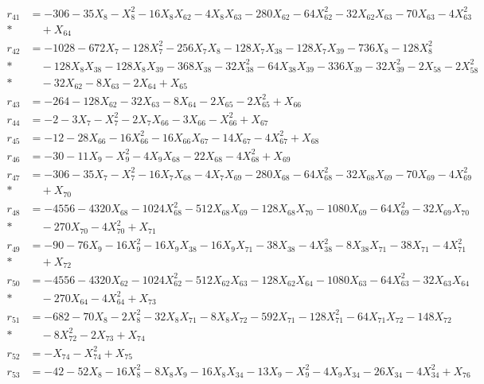 \begin{align*}
r_{41} &= -306 - 35X_{8} - X_{8}^{2} - 16X_{8}X_{62} - 4X_{8}X_{63} - 280X_{62} - 64X_{62}^{2} - 32X_{62}X_{63} - 70X_{63} - 4X_{63}^{2} \\*
&\quad  + X_{64} \\[3pt]
r_{42} &= -1028 - 672X_{7} - 128X_{7}^{2} - 256X_{7}X_{8} - 128X_{7}X_{38} - 128X_{7}X_{39} - 736X_{8} - 128X_{8}^{2} \\*
&\quad  - 128X_{8}X_{38} - 128X_{8}X_{39} - 368X_{38} - 32X_{38}^{2} - 64X_{38}X_{39} - 336X_{39} - 32X_{39}^{2} - 2X_{58} - 2X_{58}^{2} \\*
&\quad  - 32X_{62} - 8X_{63} - 2X_{64} + X_{65} \\[3pt]
r_{43} &= -264 - 128X_{62} - 32X_{63} - 8X_{64} - 2X_{65} - 2X_{65}^{2} + X_{66} \\[3pt]
r_{44} &= -2 - 3X_{7} - X_{7}^{2} - 2X_{7}X_{66} - 3X_{66} - X_{66}^{2} + X_{67} \\[3pt]
r_{45} &= -12 - 28X_{66} - 16X_{66}^{2} - 16X_{66}X_{67} - 14X_{67} - 4X_{67}^{2} + X_{68} \\[3pt]
r_{46} &= -30 - 11X_{9} - X_{9}^{2} - 4X_{9}X_{68} - 22X_{68} - 4X_{68}^{2} + X_{69} \\[3pt]
r_{47} &= -306 - 35X_{7} - X_{7}^{2} - 16X_{7}X_{68} - 4X_{7}X_{69} - 280X_{68} - 64X_{68}^{2} - 32X_{68}X_{69} - 70X_{69} - 4X_{69}^{2} \\*
&\quad  + X_{70} \\[3pt]
r_{48} &= -4556 - 4320X_{68} - 1024X_{68}^{2} - 512X_{68}X_{69} - 128X_{68}X_{70} - 1080X_{69} - 64X_{69}^{2} - 32X_{69}X_{70} \\*
&\quad  - 270X_{70} - 4X_{70}^{2} + X_{71} \\[3pt]
r_{49} &= -90 - 76X_{9} - 16X_{9}^{2} - 16X_{9}X_{38} - 16X_{9}X_{71} - 38X_{38} - 4X_{38}^{2} - 8X_{38}X_{71} - 38X_{71} - 4X_{71}^{2} \\*
&\quad  + X_{72} \\[3pt]
r_{50} &= -4556 - 4320X_{62} - 1024X_{62}^{2} - 512X_{62}X_{63} - 128X_{62}X_{64} - 1080X_{63} - 64X_{63}^{2} - 32X_{63}X_{64} \\*
&\quad  - 270X_{64} - 4X_{64}^{2} + X_{73} \\[3pt]
r_{51} &= -682 - 70X_{8} - 2X_{8}^{2} - 32X_{8}X_{71} - 8X_{8}X_{72} - 592X_{71} - 128X_{71}^{2} - 64X_{71}X_{72} - 148X_{72} \\*
&\quad  - 8X_{72}^{2} - 2X_{73} + X_{74} \\[3pt]
r_{52} &= -X_{74} - X_{74}^{2} + X_{75} \\[3pt]
r_{53} &= -42 - 52X_{8} - 16X_{8}^{2} - 8X_{8}X_{9} - 16X_{8}X_{34} - 13X_{9} - X_{9}^{2} - 4X_{9}X_{34} - 26X_{34} - 4X_{34}^{2} + X_{76} \\[3pt]

\end{align*}
